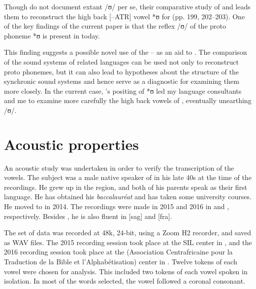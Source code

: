 \documentclass[output=paper,colorlinks,citecolor=brown]{langscibook}
\begin{document}
Though \citeauthor{BoyeldieuCloarec-Heiss2001} do not document extant /ʊ/ per se, their comparative study of  and  leads them to reconstruct the high back [–ATR] vowel *ʊ for  (pp. 199, 202--203). One of the key findings of the current paper is that the reflex /ʊ/ of the proto phoneme *ʊ is present in  today.

This finding suggests a possible novel use of the  -- as an aid to . The comparison of the sound systems of related languages can be used not only to reconstruct proto phonemes, but it can also lead to hypotheses about the structure of the synchronic sound systems and hence serve as a diagnostic for examining them more closely. In the current case, \citeauthor{BoyeldieuCloarec-Heiss2001}'s positing of *ʊ led my language consultants and me to examine more carefully the high back vowels of , eventually unearthing /ʊ/.

\section{Acoustic properties}\label{sec:olson:3}

An acoustic study  was undertaken in order to verify the transcription of the  vowels. The subject was a male native speaker of  in his late 40s at the time of the recordings. He grew up in the  region, and both of his parents speak  as their first language. He has obtained his \textit{baccalauréat} and has taken some university courses. He moved to  in 2014. The recordings were made in 2015 and 2016 in  and , respectively. Besides , he is also fluent in  [sag] and  [fra].

The set of data was recorded at 48k, 24-bit, using a Zoom H2 recorder, and saved as WAV files. The 2015 recording session took place at the SIL center in , and the 2016 recording session took place at the  (Association Centrafricaine pour la Traduction de la Bible et l’Alphabétisation) center in . Twelve tokens of each vowel were chosen for analysis. This included two tokens of each vowel spoken in isolation. In most of the words selected, the vowel followed a coronal consonant.
\end{document}

